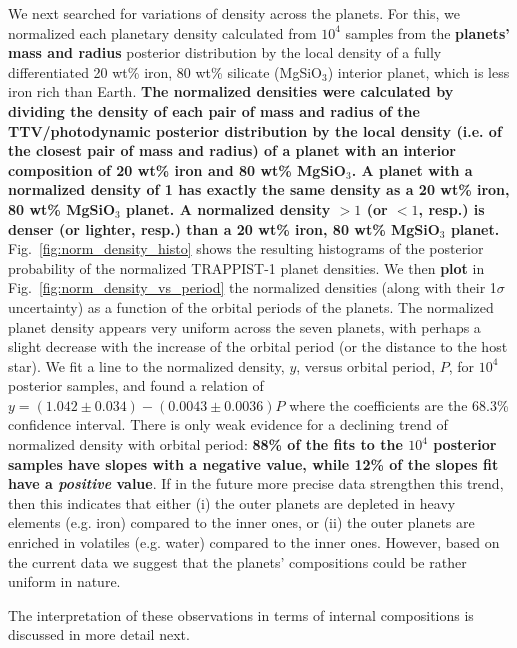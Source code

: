 \documentclass[twocolumn]{aastex63}
\begin{document}
We next searched for variations of density across the planets. For this, we normalized each planetary density calculated from $10^4$ samples from the \textbf{planets' mass and radius} posterior distribution by the local density of a fully differentiated 20 wt\% iron, 80 wt\% silicate (MgSiO$_3$) interior planet, which is less iron rich than Earth.  \textbf{The normalized densities were calculated by dividing the density of each pair of mass and radius of the TTV/photodynamic posterior distribution by the local density (i.e. of the closest pair of mass and radius) of a planet with an interior composition of 20 wt\% iron and 80 wt\% MgSiO$_3$. A planet with a normalized density of 1 has exactly the same density as a 20 wt\% iron, 80 wt\% MgSiO$_3$ planet. A normalized density ${>}1$ (or ${<}1$, resp.) is denser (or lighter, resp.) than a 20 wt\% iron, 80 wt\% MgSiO$_3$ planet.}
Fig.~\ref{fig:norm_density_histo} shows the resulting histograms of the posterior probability of the normalized TRAPPIST-1 planet densities. We then \textbf{plot} in Fig.~\ref{fig:norm_density_vs_period} the normalized densities (along with their 1$\sigma$ uncertainty) as a function of the orbital periods of the planets.  The normalized planet density appears very uniform across the seven planets, with perhaps a slight decrease with the increase of the orbital period (or the distance to the host star).  We fit a line to the normalized density, $y$, versus orbital period, $P$, for $10^4$ posterior samples, and found a relation of \textbf{$y=(1.042{\pm}0.034){-}(0.0043{\pm}0.0036)P$} where the
coefficients are the 68.3\% confidence interval. There is only weak evidence for a declining trend of normalized density with orbital period: \textbf{88\% of the fits to the $10^4$ posterior samples have slopes with a negative value, while 12\% of the slopes fit have a \emph{positive} value}.  If in the future more precise data strengthen this trend, then
this indicates that either (i) the outer planets are depleted in heavy elements (e.g. iron) compared to the inner ones, or (ii) the outer planets are enriched in volatiles (e.g. water) compared to the inner ones.  However, based on the current data we suggest that the planets' compositions could be rather uniform in nature.

The interpretation of these observations in terms of internal compositions is discussed in more detail next.
\end{document}
